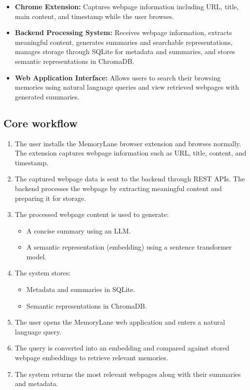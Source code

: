 \documentclass[11pt,a4paper]{article}
\begin{document}
\begin{itemize}[leftmargin=0.7cm]

\item \textbf{Chrome Extension:} Captures webpage information including URL, title, main content, and timestamp while the user browses.

\item \textbf{Backend Processing System:} Receives webpage information, extracts meaningful content, generates summaries and searchable representations, manages storage through SQLite for metadata and summaries, and stores semantic representations in ChromaDB.

\item \textbf{Web Application Interface:} Allows users to search their browsing memories using natural language queries and view retrieved webpages with generated summaries.

\end{itemize}

\subsection{Core workflow}

\begin{enumerate}[leftmargin=0.7cm]

\item The user installs the MemoryLane browser extension and browses normally. The extension captures webpage information such as URL, title, content, and timestamp.

\item The captured webpage data is sent to the backend through REST APIs. The backend processes the webpage by extracting meaningful content and preparing it for storage.

\item The processed webpage content is used to generate:
\begin{itemize}
    \item A concise summary using an LLM.
    \item A semantic representation (embedding) using a sentence transformer model.
\end{itemize}

\item The system stores:
\begin{itemize}
    \item Metadata and summaries in SQLite.
    \item Semantic representations in ChromaDB.
\end{itemize}

\item The user opens the MemoryLane web application and enters a natural language query.

\item The query is converted into an embedding and compared against stored webpage embeddings to retrieve relevant memories.

\item The system returns the most relevant webpages along with their summaries and metadata.

\end{enumerate}
\end{document}
